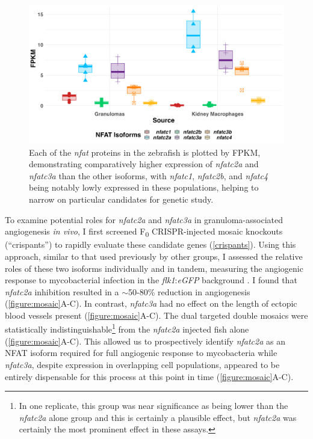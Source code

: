 \begin{figure}
\centering
\includegraphics[width=\textwidth]{images/nfat_expression.png}
\caption[Expression of NFAT isoforms in the granuloma and kidney macrophages]{Each of the \textit{nfat} proteins in the zebrafish is plotted by FPKM, demonstrating comparatively higher expression of \textit{nfatc2a} and \textit{nfatc3a} than the other isoforms, with \textit{nfatc1}, \textit{nfatc2b}, and \textit{nfatc4} being notably lowly expressed in these populations, helping to narrow on particular candidates for genetic study.}
\label{figure:mosaic}
\end{figure}


To examine potential roles for \textit{nfatc2a} and \textit{nfatc3a} in granuloma\hyp{}associated angiogenesis \textit{in vivo}, I first screened F\textsubscript{0} CRISPR\hyp{}injected mosaic knockouts (``crispants'') to rapidly evaluate these candidate genes (\autoref{crispants}). Using this approach, similar to that used previously by other groups, I assessed the relative roles of these two isoforms individually and in tandem, measuring the angiogenic response to mycobacterial infection in the \textit{flk1}:\textit{eGFP} background \citep{Jao2013, Hoshijima2016, Wu2018, Hoshijima2019, Kroll2021}. I found that \textit{nfatc2a} inhibition resulted in a $\sim$50\hyp{}80\% reduction in angiogenesis (\autoref{figure:mosaic}A\hyp{}C). In contrast, \textit{nfatc3a} had no effect on the length of ectopic blood vessels present (\autoref{figure:mosaic}A\hyp{}C). The dual targeted double mosaics were statistically indistinguishable\footnote{In one replicate, this group was near significance as being lower than the \textit{nfatc2a} alone group and this is certainly a plausible effect, but \textit{nfatc2a} was certainly the most prominent effect in these assays.} from the \textit{nfatc2a} injected fish alone (\autoref{figure:mosaic}A\hyp{}C). This allowed us to prospectively identify \textit{nfatc2a} as an NFAT isoform required for full angiogenic response to mycobacteria while \textit{nfatc3a}, despite expression in overlapping cell populations, appeared to be entirely dispensable for this process at this point in time (\autoref{figure:mosaic}A\hyp{}C). 

